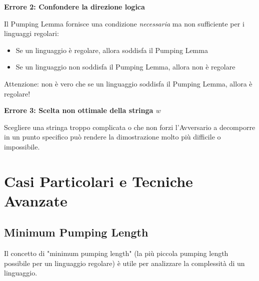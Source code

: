 \documentclass[12pt,a4paper]{article}
\begin{document}
\begin{errorecomune}
\textbf{Errore 2: Confondere la direzione logica}

Il Pumping Lemma fornisce una condizione \emph{necessaria} ma non sufficiente per i linguaggi regolari:
\begin{itemize}
    \item Se un linguaggio è regolare, allora soddisfa il Pumping Lemma
    \item Se un linguaggio non soddisfa il Pumping Lemma, allora non è regolare
\end{itemize}

Attenzione: non è vero che se un linguaggio soddisfa il Pumping Lemma, allora è regolare!
\end{errorecomune}

\begin{errorecomune}
\textbf{Errore 3: Scelta non ottimale della stringa $w$}

Scegliere una stringa troppo complicata o che non forzi l'Avversario a decomporre in un punto specifico può rendere la dimostrazione molto più difficile o impossibile.
\end{errorecomune}

\section{Casi Particolari e Tecniche Avanzate}

\subsection{Minimum Pumping Length}

Il concetto di "minimum pumping length" (la più piccola pumping length possibile per un linguaggio regolare) è utile per analizzare la complessità di un linguaggio.
\end{document}

